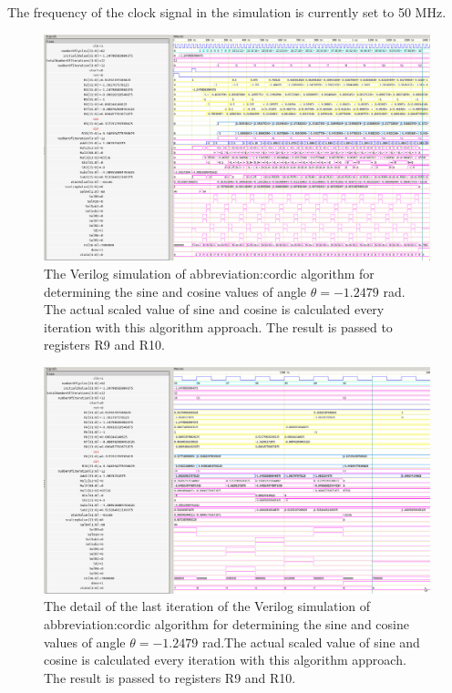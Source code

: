 \documentclass[a4paper, twoside, 11pt]{article}
\begin{document}
    The frequency of the clock signal in the simulation is currently set to 50 MHz.

        \begin{figure}[htbp!]
            \centering
            \includegraphics[width=1\textwidth]{src/png/inverted/cordic-verilog-whole-sim.png}
            \caption{The Verilog simulation of \gls{abbreviation:cordic} algorithm for determining the sine and cosine values of angle $\theta = -1.2479$ rad. The actual scaled value of sine and cosine is calculated every iteration with this algorithm approach. The result is passed to registers R9 and R10.}
            \label{fig:cordic-verilog-whole-sim}
        \end{figure}

        \begin{figure}[htbp!]
            \centering
            \includegraphics[width=1\textwidth]{src/png/inverted/cordic-verilog-end-of-the-simulation.png}
            \caption{The detail of the last iteration of the Verilog simulation of \gls{abbreviation:cordic} algorithm for determining the sine and cosine values of angle $\theta = -1.2479$ rad.The actual scaled value of sine and cosine is calculated every iteration with this algorithm approach. The result is passed to registers R9 and R10.}
            \label{fig:cordic-verilog-end-of-the-simulation}
        \end{figure}
\end{document}
